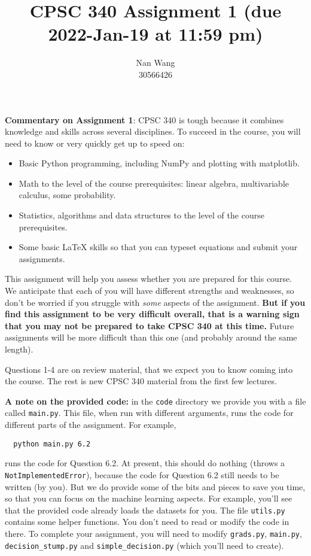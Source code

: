 \documentclass{article}
\author{Nan Wang\\30566426}
\begin{document}
  \title{CPSC 340 Assignment 1 (due 2022-Jan-19 at 11:59 pm)}

  \date{}
  \maketitle



  \textbf{Commentary on Assignment 1}: CPSC 340 is tough because it combines knowledge and skills across several disciplines. To succeed
  in the course, you will need to know or very quickly get up to speed on:
  \begin{itemize}
  \item Basic Python programming, including NumPy and plotting with matplotlib.
  \item Math to the level of the course prerequisites: linear algebra, multivariable calculus, some probability.
  \item Statistics, algorithms and data structures to the level of the course prerequisites.
  \item Some basic LaTeX skills so that you can typeset equations and submit your assignments.
  \end{itemize}

  This assignment will help you assess whether you are prepared for this course. We anticipate that each
  of you will have different strengths and weaknesses, so don't be worried if you struggle with \emph{some} aspects
  of the assignment. \textbf{But if you find this assignment
  to be very difficult overall, that is a warning sign that you may not be prepared to take CPSC 340
  at this time.} Future assignments will be more difficult than this one (and probably around the same length).

  Questions 1-4 are on review material, that we expect you to know coming into the course. The rest is new CPSC 340 material from the first few lectures.

  \textbf{A note on the provided code:} in the \texttt{code} directory we provide you with a file called
  \texttt{main.py}. This file, when run with different arguments, runs the code for different
  parts of the assignment. For example,
  \begin{verbatim}
  python main.py 6.2
  \end{verbatim}
  runs the code for Question 6.2. At present, this should do nothing (throws a \texttt{NotImplementedError}), because the code
  for Question 6.2 still needs to be written (by you). But we do provide some of the bits
  and pieces to save you time, so that you can focus on the machine learning aspects.
  For example, you'll see that the provided code already loads the datasets for you.
  The file \texttt{utils.py} contains some helper functions.
  You don't need to read or modify the code in there.
  To complete your assignment, you will need to modify \texttt{grads.py}, \texttt{main.py}, \texttt{decision\string_stump.py} and \texttt{simple\string_decision.py} (which you'll need to create).
\end{document}
